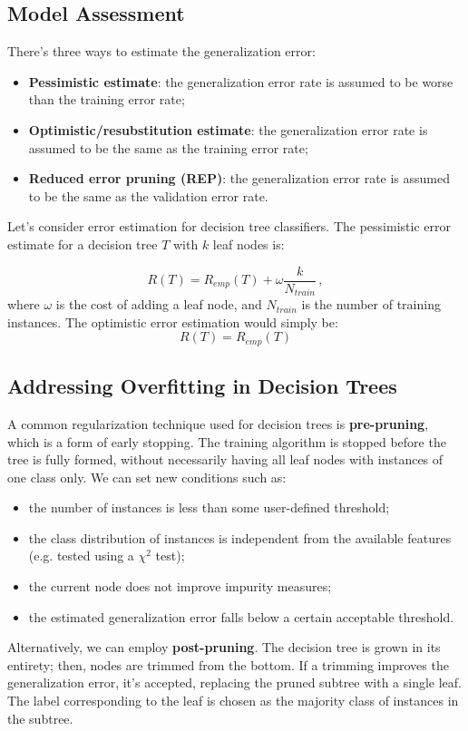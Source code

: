 \subsection{Model Assessment}

There's three ways to estimate the generalization error:
\begin{itemize}
    \item \textbf{Pessimistic estimate}: the generalization error rate is assumed to be worse than the training error rate;
    \item \textbf{Optimistic/resubstitution estimate}: the generalization error rate is assumed to be the same as the training error rate;
    \item \textbf{Reduced error pruning (REP)}: the generalization error rate is assumed to be the same as the validation error rate.
\end{itemize}

Let's consider error estimation for decision tree classifiers. The pessimistic error estimate for a decision tree $T$ with $k$ leaf nodes is:

\begin{equation*}
    R(T) = R_{emp}(T) + \omega \dfrac{k}{N_{train}} \,,
\end{equation*}
where $\omega$ is the cost of adding a leaf node, and $N_{train}$ is the number of training instances. The optimistic error estimation would simply be:
\begin{equation*}
    R(T) = R_{emp}(T)
\end{equation*}

\subsection{Addressing Overfitting in Decision Trees}

A common regularization technique used for decision trees is \textbf{pre-pruning}, which is a form of early stopping. The training algorithm is stopped before the tree is fully formed, without necessarily having all leaf nodes with instances of one class only. We can set new conditions such as:
\begin{itemize}
    \item the number of instances is less than some user-defined threshold;
    \item the class distribution of instances is independent from the available features (e.g. tested using a $\chi^2$ test);
    \item the current node does not improve impurity measures;
    \item the estimated generalization error falls below a certain acceptable threshold.
\end{itemize}

Alternatively, we can employ \textbf{post-pruning}. The decision tree is grown in its entirety; then, nodes are trimmed from the bottom. If a trimming improves the generalization error, it's accepted, replacing the pruned subtree with a single leaf. The label corresponding to the leaf is chosen as the majority class of instances in the subtree.

